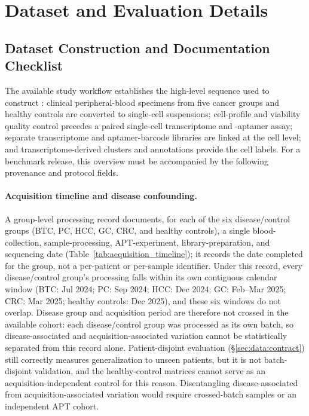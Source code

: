 \section{Dataset and Evaluation Details}

\subsection{Dataset Construction and Documentation Checklist}
\label{sec:appendix:dataset_documentation}

The available study workflow establishes the high-level sequence used to construct
\ourbench{}: clinical peripheral-blood specimens from five cancer groups and healthy
controls are converted to single-cell suspensions; cell-profile and viability quality
control precedes a paired single-cell transcriptome and \numaptfeatures{}-aptamer assay; separate
transcriptome and aptamer-barcode libraries are linked at the cell level; and
transcriptome-derived clusters and annotations provide the cell labels. For a
benchmark release, this overview must be accompanied by the following provenance
and protocol fields.

\paragraph{Acquisition timeline and disease confounding.}
A group-level processing record documents, for each of the six disease/control
groups (BTC, PC, HCC, GC, CRC, and healthy controls), a single blood-collection,
sample-processing, APT-experiment, library-preparation, and sequencing date
(Table~\ref{tab:acquisition_timeline}); it records the date completed for the
group, not a per-patient or per-sample identifier. Under this record, every
disease/control group's processing falls within its own contiguous calendar
window (BTC: Jul 2024; PC: Sep 2024; HCC: Dec 2024; GC: Feb--Mar 2025; CRC: Mar
2025; healthy controls: Dec 2025), and these six windows do not overlap. Disease
group and acquisition period are therefore not crossed in the available cohort:
each disease/control group was processed as its own batch, so disease-associated
and acquisition-associated variation cannot be statistically separated from this
record alone. Patient-disjoint evaluation (\S\ref{sec:data:contract}) still
correctly measures generalization to unseen patients, but it is not
batch-disjoint validation, and the healthy-control matrices cannot serve as an
acquisition-independent control for this reason. Disentangling disease-associated
from acquisition-associated variation would require crossed-batch samples or an
independent APT cohort.

